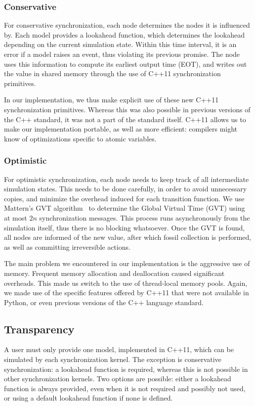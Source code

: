 \subsubsection{Conservative}
For conservative synchronization, each node determines the nodes it is influenced by.
Each model provides a lookahead function, which determines the lookahead depending on the current simulation state.
Within this time interval, it is an error if a model raises an event, thus violating its previous promise.
The node uses this information to compute its earliest output time (EOT), and writes out the value in shared memory through the use of C++11 synchronization primitives.

In our implementation, we thus make explicit use of these new C++11 synchronization primitives.
Whereas this was also possible in previous versions of the C++ standard, it was not a part of the standard itself.
C++11 allows us to make our implementation portable, as well as more efficient: compilers might know of optimizations specific to atomic variables.

\subsubsection{Optimistic}
For optimistic synchronization, each node needs to keep track of all intermediate simulation states.
This needs to be done carefully, in order to avoid unnecessary copies, and minimize the overhead induced for each transition function.
We use Mattern's GVT algorithm~\cite{mattern} to determine the Global Virtual Time (GVT) using at most $2n$ synchronization messages.
This process runs asynchronously from the simulation itself, thus there is no blocking whatsoever.
Once the GVT is found, all nodes are informed of the new value, after which fossil collection is performed, as well as committing irreversible actions.

The main problem we encountered in our implementation is the aggressive use of memory.
Frequent memory allocation and deallocation caused significant overheads.
This made us switch to the use of thread-local memory pools.
Again, we made use of the specific features offered by C++11 that were not available in Python, or even previous versions of the C++ language standard.

\subsection{Transparency}
A user must only provide one model, implemented in C++11, which can be simulated by each synchronization kernel.
The exception is conservative synchronization: a lookahead function is required, whereas this is not possible in other synchronization kernels.
Two options are possible: either a lookahead function is always provided, even when it is not required and possibly not used, or using a default lookahead function if none is defined.

